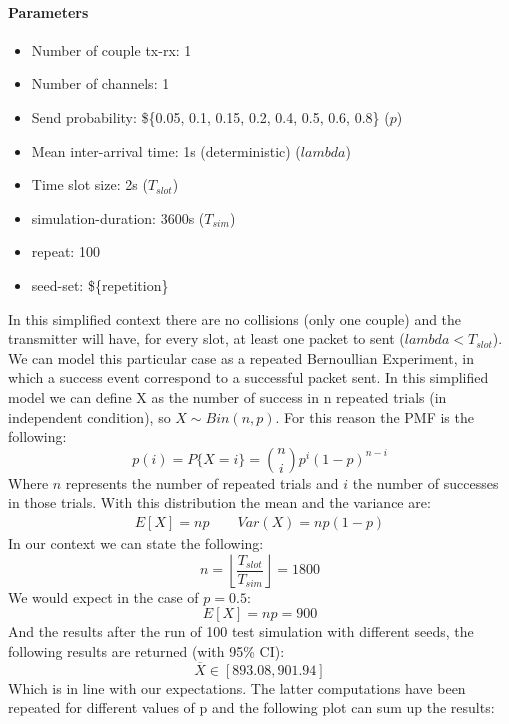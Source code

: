 \paragraph{Parameters}
\begin{itemize}
	\item Number of couple tx-rx: 1
	\item Number of channels: 1
	\item Send probability: \$\{0.05, 0.1, 0.15, 0.2, 0.4, 0.5, 0.6, 0.8\} ($p$)
	\item Mean inter-arrival time: 1s (deterministic) ($lambda$)
	\item Time slot size: 2s ($T_{slot}$)
	\item simulation-duration: 3600s ($T_{sim}$)
	\item repeat: 100
	\item seed-set: \$\{repetition\}
\end{itemize}
In this simplified context there are no collisions (only one couple) and the transmitter will have, for every slot, at least one packet to sent ($lambda < T_{slot}$). We can model this particular case as a repeated Bernoullian Experiment, in which a success event correspond to a successful packet sent. In this simplified model we can define X as the number of success in n repeated trials (in independent condition), so $X \sim Bin(n, p)$. For this reason the PMF is the following:
\begin{equation}
	p(i) = P\{X = i\} = \binom{n}{i} p^{i} (1-p)^{n-i}
\end{equation}
Where $n$ represents the number of repeated trials and $i$ the number of successes in those trials. With this distribution the mean and the variance are:
\begin{align*}
	E[X] = np \qquad     
	Var(X) = np(1-p)
\end{align*}
In our context we can state the following:
\begin{equation}
	n = \left \lfloor{\dfrac{T_{slot}}{T_{sim}}}\right \rfloor = 1800
\end{equation}
We would expect in the case of $p = 0.5$:
\begin{equation}
	E[X] = np = 900
\end{equation}
And the results after the run of 100 test simulation with different seeds, the following results are returned (with 95\% CI):
\begin{equation}
	\overline{X} \in [893.08, 901.94]
\end{equation}
Which is in line with our expectations. The latter computations have been repeated for different values of p and the following plot can sum up the results:

